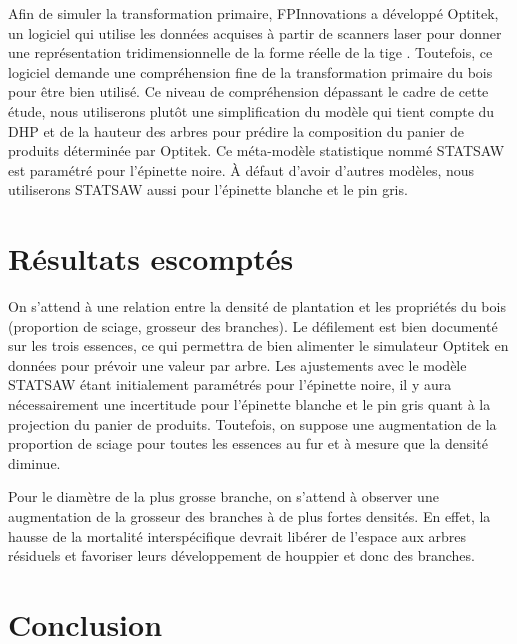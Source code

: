 \documentclass[letterpaper, 12pt]{article}
\begin{document}
\begin{onehalfspace}
Afin de simuler la transformation primaire, FPInnovations a développé Optitek, un logiciel qui utilise les données acquises à partir de scanners laser pour donner une représentation tridimensionnelle de la forme réelle de la tige \cite{FPInnovations2014}. Toutefois, ce logiciel demande une compréhension fine de la transformation primaire du bois pour être bien utilisé. Ce niveau de compréhension dépassant le cadre de cette étude, nous utiliserons plutôt une simplification du modèle qui tient compte du DHP et de la hauteur des arbres pour prédire la composition du panier de produits déterminée par Optitek. Ce méta-modèle statistique nommé STATSAW \cite{Auty2014} est paramétré pour l'épinette noire. À défaut d'avoir d'autres modèles, nous utiliserons STATSAW aussi pour l'épinette blanche et le pin gris.

\section{Résultats escomptés}
On s’attend à une relation entre la densité de plantation et les propriétés du bois (proportion de sciage, grosseur des branches). Le défilement est bien documenté sur les trois essences, ce qui permettra de bien alimenter le simulateur Optitek en données pour prévoir une valeur par arbre. Les ajustements avec le modèle STATSAW étant initialement paramétrés pour l'épinette noire, il y aura nécessairement une incertitude pour l'épinette blanche et le pin gris quant à la projection du panier de produits. Toutefois, on suppose une augmentation de la proportion de sciage pour toutes les essences au fur et à mesure que la densité diminue. 

\vspace{12pt}
Pour le diamètre de la plus grosse branche, on s'attend à observer une augmentation de la grosseur des branches à de plus fortes densités. En effet, la hausse de la mortalité interspécifique devrait libérer de l'espace aux arbres résiduels et favoriser leurs développement de houppier et donc des branches. 





\section{Conclusion}


\end{onehalfspace}
\end{document}
